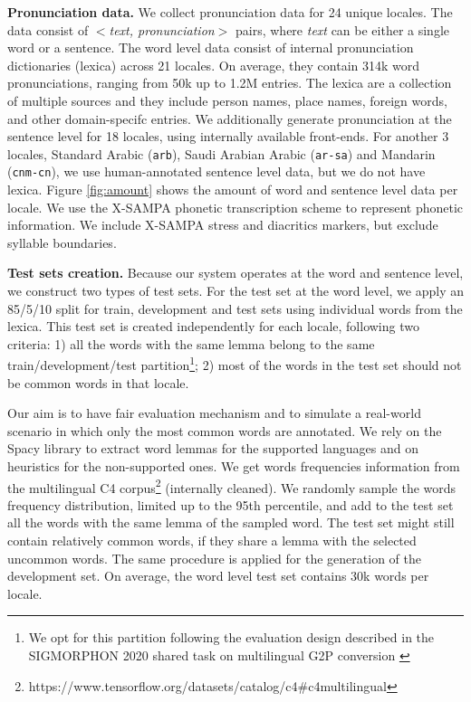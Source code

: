 \textbf{Pronunciation data.}
We collect pronunciation data for 24 unique locales. The data consist of \textit{$<$text, pronunciation$>$} pairs, where \textit{text} can be either a single word or a sentence. 
The word level data consist of internal pronunciation dictionaries (lexica) across 21 locales. On average, they contain \mytextapprox314k word pronunciations,
ranging from 50k up to 1.2M entries. The lexica are a collection of multiple sources and they include person names, place names, foreign words, and other domain-specifc entries. We additionally generate pronunciation at the sentence level for 18 locales, using internally available front-ends. For another 3 locales, Standard Arabic (\texttt{arb}), Saudi Arabian Arabic (\texttt{ar-sa}) and Mandarin (\texttt{cnm-cn}), we use human-annotated sentence level data, but we do not have lexica. 
Figure \ref{fig:amount} shows the amount of word and sentence level data per locale. 
We use the X-SAMPA phonetic transcription scheme to represent phonetic information. We include X-SAMPA stress and diacritics markers, but exclude syllable boundaries.


\textbf{Test sets creation.}
Because our system operates at the word and sentence level, we construct two types of test sets.
For the test set at the word level, we apply an 85/5/10 split for train, development and test sets using individual words from the lexica.
This test set is created independently for each locale, following two criteria: 1) all the words with the same lemma belong to the same train/development/test partition\footnote{We opt for this partition following the evaluation design described in the SIGMORPHON 2020 shared task on multilingual G2P conversion \cite{sigmorphon20}}; 2) most of the words in the test set should not be common words in that locale. 

Our aim is to have fair evaluation mechanism and to simulate a real-world scenario in which only the most common words are annotated. We rely on the Spacy library \cite{spacy2} to extract word lemmas for the supported languages and on heuristics for the non-supported ones. We get words frequencies information from the multilingual C4 corpus\footnote{https://www.tensorflow.org/datasets/catalog/c4\#c4multilingual} (internally cleaned). We randomly sample the words frequency distribution, limited up to the 95th percentile, and add to the test set all the words with the same lemma of the sampled word. The test set might still contain relatively common words, if they share a lemma with the selected uncommon words. The same procedure is applied for the generation of the development set. On average, the word level test set contains \mytextapprox30k words per locale. 

